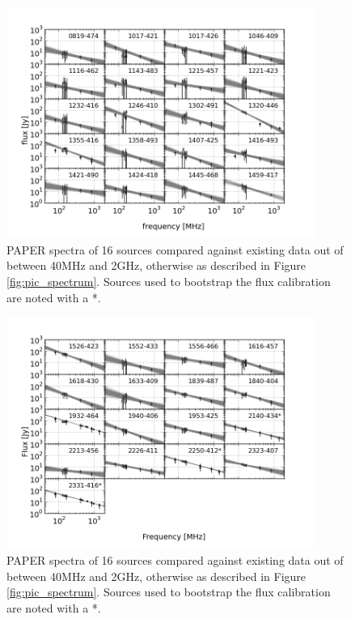 \documentclass[preprint]{aastex}
\begin{document}
\begin{figure}[htbp]
\begin{center}
\includegraphics[width=0.9\textwidth]{plots/srcfig_2.png}
\caption{
PAPER spectra of 16 sources compared against existing data out of
\cite{Vollmer:2010p6422} between 40MHz and 2GHz, otherwise as described in
Figure \ref{fig:pic_spectrum}.\label{fig:srcs2} Sources used to bootstrap the
flux calibration are noted with a *.
}
\end{center}
\end{figure}

\begin{figure}[htbp]
\begin{center}
\includegraphics[width=0.9\textwidth]{plots/srcfig_3.png}
\caption{
PAPER spectra of 16 sources compared against existing data out of
\cite{Vollmer:2010p6422} between 40MHz and 2GHz, otherwise as described in
Figure \ref{fig:pic_spectrum}.\label{fig:srcs3} Sources used to bootstrap the
flux calibration are noted with a *.
}
\end{center}
\end{figure}
\end{document}
